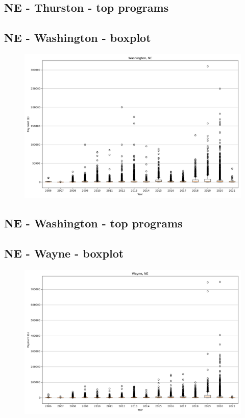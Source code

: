 \subsection*{NE - Thurston - top programs}

\newpage
\subsection*{NE - Washington - boxplot}
\begin{figure}[h]
\centering
\includegraphics[width=7in]{../output/boxplots/counties/Washington-NE_boxplot.png}
\end{figure}


\subsection*{NE - Washington - top programs}

\newpage
\subsection*{NE - Wayne - boxplot}
\begin{figure}[h]
\centering
\includegraphics[width=7in]{../output/boxplots/counties/Wayne-NE_boxplot.png}
\end{figure}


